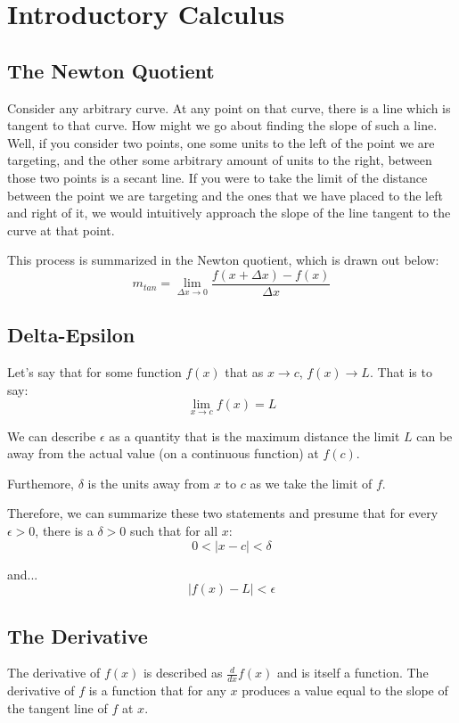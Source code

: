 \chapter{Introductory Calculus}
\section{The Newton Quotient}
Consider any arbitrary curve.  At any point on that curve, there is a line which
is tangent to that curve.  How might we go about finding the slope of such a
line.  Well, if you consider two points, one some units to the left of the
point we are targeting, and the other some arbitrary amount of units to the
right, between those two points is a secant line.  If you were to take the limit
of the distance between the point we are targeting and the ones that we have
placed to the left and right of it, we would intuitively approach the slope of
the line tangent to the curve at that point.

This process is summarized in the Newton quotient, which is drawn out below:
\begin{equation}
m_{tan}=\lim_{\Delta x\to 0} \frac{f(x+\Delta x)-f(x)}{\Delta x}
\end{equation}

\section{Delta-Epsilon}
Let's say that for some function $f(x)$ that as $x\to c$, $f(x)\to L$.  That is
to say:
\begin{equation}
\lim_{x \to c} f(x) = L
\end{equation}

We can describe $\epsilon$ as a quantity that is the maximum distance the limit
$L$ can be away from the actual value (on a continuous function) at $f(c)$.

Furthemore, $\delta$ is the units away from $x$ to $c$ as we take the limit of
$f$.

Therefore, we can summarize these two statements and presume that for every
$\epsilon > 0$, there is a $\delta > 0$ such that for all $x$:
\begin{equation}
0 < |x-c| < \delta
\end{equation}

and...
\begin{equation}
|f(x)-L| < \epsilon
\end{equation}

\section{The Derivative}
The derivative of $f(x)$ is described as $\frac{d}{dx}f(x)$ and is itself a
function.  The derivative of $f$ is a function that for any $x$ produces a value
equal to the slope of the tangent line of $f$ at $x$.


